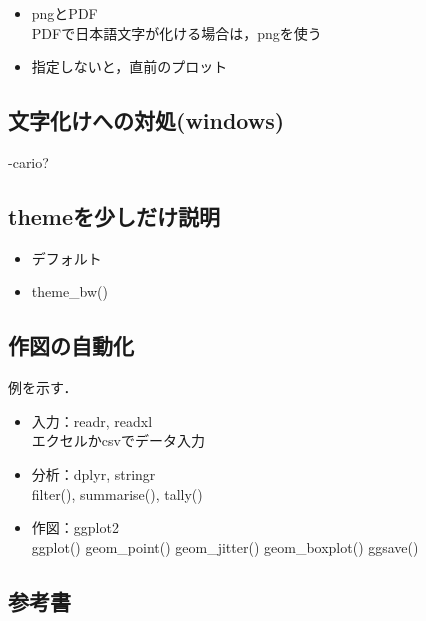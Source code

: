 \documentclass[
]{article}
\providecommand{\tightlist}{%
  \setlength{\itemsep}{0pt}\setlength{\parskip}{0pt}}
\begin{document}
\begin{itemize}
\item
  pngとPDF\\
  PDFで日本語文字が化ける場合は，pngを使う
\item
  指定しないと，直前のプロット
\end{itemize}

\hypertarget{ux6587ux5b57ux5316ux3051ux3078ux306eux5bfeux51e6windows}{%
\subsection{文字化けへの対処(windows)}\label{ux6587ux5b57ux5316ux3051ux3078ux306eux5bfeux51e6windows}}

-cario?

\hypertarget{themeux3092ux5c11ux3057ux3060ux3051ux8aacux660e}{%
\subsection{themeを少しだけ説明}\label{themeux3092ux5c11ux3057ux3060ux3051ux8aacux660e}}

\begin{itemize}
\tightlist
\item
  デフォルト\\
\item
  theme\_bw()
\end{itemize}

\hypertarget{ux4f5cux56f3ux306eux81eaux52d5ux5316}{%
\subsection{作図の自動化}\label{ux4f5cux56f3ux306eux81eaux52d5ux5316}}

例を示す．

\begin{itemize}
\tightlist
\item
  入力：readr, readxl\\
  エクセルかcsvでデータ入力
\item
  分析：dplyr, stringr\\
  filter(), summarise(), tally()
\item
  作図：ggplot2\\
  ggplot()
  geom\_point()
  geom\_jitter()
  geom\_boxplot()
  ggsave()
\end{itemize}

\hypertarget{ux53c2ux8003ux66f8}{%
\subsection{参考書}\label{ux53c2ux8003ux66f8}}
\end{document}
